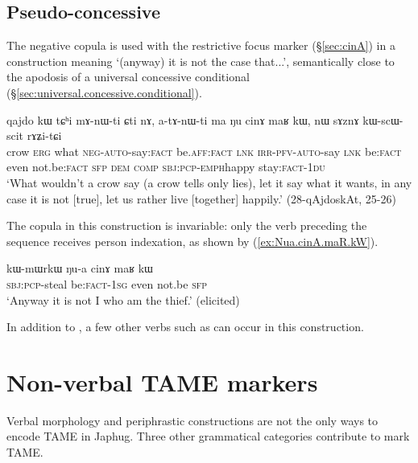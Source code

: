 \subsection{Pseudo-concessive} \label{sec:cinAmaRkW}
The negative copula  is used with the restrictive focus marker  (§\ref{sec:cinA}) in a construction meaning `(anyway) it is not the case that...', semantically close to the apodosis of a universal concessive conditional (§\ref{sec:universal.concessive.conditional}).


\begin{exe}
	\ex \label{ex:Nu.cinA.maR.kW}
	\gll qajdo kɯ tɕʰi mɤ-nɯ-ti ɕti nɤ, a-tɤ-nɯ-ti ma ŋu cinɤ maʁ kɯ, nɯ sɤznɤ kɯ-scɯ-scit rɤʑi-tɕi \\
	crow \textsc{erg} what \textsc{neg}-\textsc{auto}-say:\textsc{fact} be.\textsc{aff}:\textsc{fact} \textsc{lnk} \textsc{irr}-\textsc{pfv}-\textsc{auto}-say \textsc{lnk} be:\textsc{fact} even not.be:\textsc{fact} \textsc{sfp} \textsc{dem} \textsc{comp} \textsc{sbj}:\textsc{pcp}-\textsc{emph}\redp{}happy stay:\textsc{fact}-\textsc{1du} \\
	\glt `What wouldn't a crow say (a crow tells only lies), let it say what it wants, in any case it is not [true], let us rather live [together] happily.' (28-qAjdoskAt, 25-26)
\end{exe} 

The copula  in this construction is invariable: only the verb preceding the  sequence receives person indexation, as shown by (\ref{ex:Nua.cinA.maR.kW}).  

\begin{exe}
	\ex \label{ex:Nua.cinA.maR.kW}
	\gll  kɯ-mɯrkɯ ŋu-a cinɤ maʁ kɯ  \\
	\textsc{sbj}:\textsc{pcp}-steal be:\textsc{fact}-\textsc{1sg} even not.be \textsc{sfp} \\
	\glt `Anyway it is not I who am the thief.' (elicited)
\end{exe}

In addition to , a few other verbs such as  can occur in this construction.

\section{Non-verbal TAME markers}  \label{sec:non.verb.TAME}
Verbal morphology and periphrastic constructions are not the only ways to encode TAME in Japhug. Three other grammatical categories contribute to mark TAME. 


